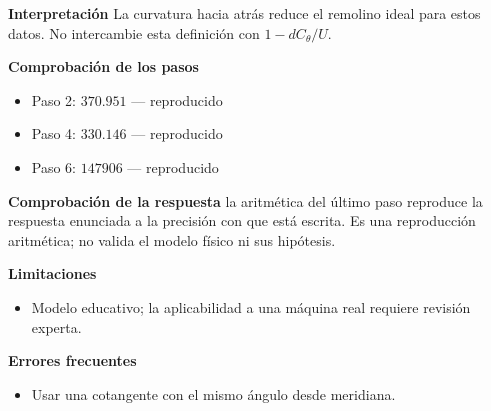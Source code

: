 \documentclass[10pt,openany]{book}
\begin{document}
\begin{tcolorbox}[title={Problema resuelto 2}, studiumworked, breakable]
\noindent\textbf{Interpretación}
La curvatura hacia atrás reduce el remolino ideal para estos datos. No intercambie esta definición con $1-dC_\theta/U$.

\noindent\textbf{Comprobación de los pasos}
\begin{itemize}
\item Paso 2: $370.951$ — reproducido
\item Paso 4: $330.146$ — reproducido
\item Paso 6: $147906$ — reproducido
\end{itemize}

\noindent\textbf{Comprobación de la respuesta} la aritmética del último paso reproduce la respuesta enunciada a la precisión con que está escrita. Es una reproducción aritmética; no valida el modelo físico ni sus hipótesis.

\noindent\textbf{Limitaciones}
\begin{itemize}
\item Modelo educativo; la aplicabilidad a una máquina real requiere revisión experta.
\end{itemize}

\noindent\textbf{Errores frecuentes}
\begin{itemize}
\item Usar una cotangente con el mismo ángulo desde meridiana.
\end{itemize}
\end{tcolorbox}
\end{document}
